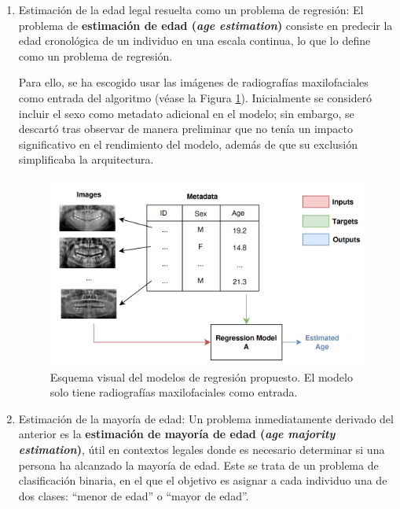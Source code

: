 \begin{enumerate}

    \item Estimación de la edad legal resuelta como un problema de regresión: El problema de \textbf{estimación de edad (\textit{age estimation})} consiste en predecir la edad cronológica de un individuo en una escala continua, lo que lo define como un problema de regresión.

    Para ello, se ha escogido usar las imágenes de radiografías maxilofaciales como entrada del algoritmo (véase la Figura \ref{fig:regression_problems}). Inicialmente se consideró incluir el sexo como metadato adicional en el modelo; sin embargo, se descartó tras observar de manera preliminar que no tenía un impacto significativo en el rendimiento del modelo, además de que su exclusión simplificaba la arquitectura. 

    \begin{figure}[htbp]
        \centering
        \includegraphics[width=\textwidth]{capitulos/cap_04/imagenes/regression_problem.png}
        \caption[
            Esquema visual del modelos de regresión propuesto. 
        ]{
            Esquema visual del modelos de regresión propuesto. 
            El modelo solo tiene radiografías maxilofaciales como entrada. 
        } 
        \label{fig:regression_problems}
    \end{figure}
    
    \item Estimación de la mayoría de edad: Un problema inmediatamente derivado del anterior es la \textbf{estimación de mayoría de edad (\textit{age majority estimation})}, útil en contextos legales donde es necesario determinar si una persona ha alcanzado la mayoría de edad. Este se trata de un problema de clasificación binaria, en el que el objetivo es asignar a cada individuo una de dos clases: ``menor de edad'' o ``mayor de edad''.
    

\end{enumerate}
